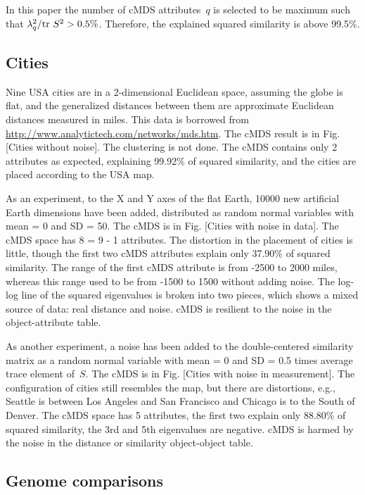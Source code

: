 \documentclass[10pt,a4paper]{article}
\begin{document}
In this paper the number of cMDS attributes~$q$ is selected to be maximum such that $\lambda_q^2 / \mathrm {tr} \  S^2 > 0.5\%$.
Therefore, the explained squared similarity is above 99.5\%.


\subsection{Cities}

Nine USA cities are in a 2-dimensional Euclidean space, assuming the globe is flat,
and the generalized distances between them are approximate Euclidean distances measured in miles.
This data is borrowed from \url{http://www.analytictech.com/networks/mds.htm}.
The cMDS result is in Fig. [Cities without noise].
The clustering is not done. The cMDS contains only 2 attributes as expected, explaining 99.92\% of squared similarity,
and the cities are placed according to the USA map.

As an experiment, to the X and Y axes of the flat Earth, 10000 new artificial Earth dimensions have been added,
distributed as random normal variables with mean = 0 and SD = 50.
The cMDS is in Fig. [Cities with noise in data].
The cMDS space has 8 = 9 - 1 attributes.
The distortion in the placement of cities is little, though the first two cMDS attributes explain only 37.90\% of squared similarity.
The range of the first cMDS attribute is from -2500 to 2000 miles,
whereas this range used to be from -1500 to 1500 without adding noise.
The log-log line of the squared eigenvalues is broken into two pieces, which shows a mixed source of data: real distance and noise.
cMDS is resilient to the noise in the object-attribute table.

As another experiment,
a noise has been added to the double-centered similarity matrix as a random normal variable
with mean = 0 and SD = 0.5 times average trace element of~$S$.
The cMDS is in Fig. [Cities with noise in measurement].
The configuration of cities still resembles the map, but there are distortions,
e.g., Seattle is between Los Angeles and San Francisco and Chicago is to the South of Denver.
The cMDS space has 5 attributes, the first two explain only 88.80\% of squared similarity,
the 3rd and 5th eigenvalues are negative.
cMDS is harmed by the noise in the distance or similarity object-object table.


\subsection{Genome comparisons}
\end{document}
